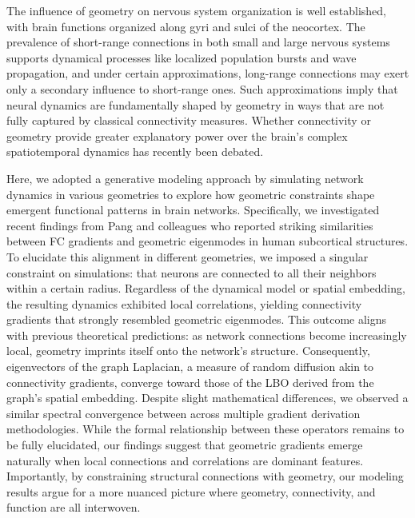 \documentclass{article}
\begin{document}
The influence of geometry on nervous system organization is well established, with brain functions organized along gyri and sulci of the neocortex\cite{petersen2024principles}. The prevalence of short-range connections in both small\cite{kunst2019cellular} and large nervous systems\cite{ercsey2013predictive} supports dynamical processes like localized population bursts and wave propagation, and under certain approximations, long-range connections may exert only a secondary influence to short-range ones\cite{robinson1997propagation}. Such approximations imply that neural dynamics are fundamentally shaped by geometry in ways that are not fully captured by classical connectivity measures\cite{robinson2016eigenmodes, pang2023geometric}. Whether connectivity or geometry provide greater explanatory power over the brain's complex spatiotemporal dynamics has recently been debated\cite{pang2023geometric, faskowitz2023commentary, pang2023reply, vohryzek2025human}.

Here, we adopted a generative modeling approach by simulating network dynamics in various geometries to explore how geometric constraints shape emergent functional patterns in brain networks. Specifically, we investigated recent findings from Pang and colleagues who reported striking similarities between FC gradients and geometric eigenmodes in human subcortical structures\cite{pang2023geometric}. To elucidate this alignment in different geometries, we imposed a singular constraint on simulations: that neurons are connected to all their neighbors within a certain radius. Regardless of the dynamical model or spatial embedding, the resulting dynamics exhibited local correlations, yielding connectivity gradients that strongly resembled geometric eigenmodes. This outcome aligns with previous theoretical predictions: as network connections become increasingly local, geometry imprints itself onto the network’s structure\cite{belkin2008towards, GarcaTrillos2019}. Consequently, eigenvectors of the graph Laplacian, a measure of random diffusion akin to connectivity gradients, converge toward those of the LBO derived from the graph's spatial embedding. Despite slight mathematical differences, we observed a similar spectral convergence between across multiple gradient derivation methodologies. While the formal relationship between these operators remains to be fully elucidated, our findings suggest that geometric gradients emerge naturally when local connections and correlations are dominant features. Importantly, by constraining structural connections with geometry, our modeling results argue for a more nuanced picture where geometry, connectivity, and function are all interwoven.
\end{document}
